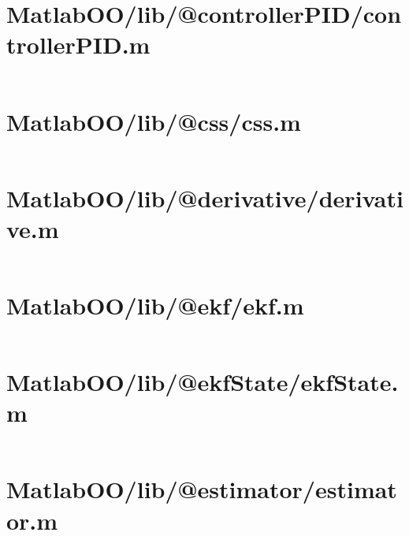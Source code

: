 \pagebreak
\section*{MatlabOO/lib/@controllerPID/controllerPID.m}\label{code:MatlabOO/lib/@controllerPID/controllerPID.m}
\inputminted[linenos,fontsize=\scriptsize]{matlab}{/home/dcouture/git/mathyourlife/TSatPy/beta_versions/matlab_object_oriented/lib/@controllerPID/controllerPID.m}

\pagebreak
\section*{MatlabOO/lib/@css/css.m}\label{code:MatlabOO/lib/@css/css.m}
\inputminted[linenos,fontsize=\scriptsize]{matlab}{/home/dcouture/git/mathyourlife/TSatPy/beta_versions/matlab_object_oriented/lib/@css/css.m}

\pagebreak
\section*{MatlabOO/lib/@derivative/derivative.m}\label{code:MatlabOO/lib/@derivative/derivative.m}
\inputminted[linenos,fontsize=\scriptsize]{matlab}{/home/dcouture/git/mathyourlife/TSatPy/beta_versions/matlab_object_oriented/lib/@derivative/derivative.m}

\pagebreak
\section*{MatlabOO/lib/@ekf/ekf.m}\label{code:MatlabOO/lib/@ekf/ekf.m}
\inputminted[linenos,fontsize=\scriptsize]{matlab}{/home/dcouture/git/mathyourlife/TSatPy/beta_versions/matlab_object_oriented/lib/@ekf/ekf.m}

\pagebreak
\section*{MatlabOO/lib/@ekfState/ekfState.m}\label{code:MatlabOO/lib/@ekfState/ekfState.m}
\inputminted[linenos,fontsize=\scriptsize]{matlab}{/home/dcouture/git/mathyourlife/TSatPy/beta_versions/matlab_object_oriented/lib/@ekfState/ekfState.m}

\pagebreak
\section*{MatlabOO/lib/@estimator/estimator.m}\label{code:MatlabOO/lib/@estimator/estimator.m}
\inputminted[linenos,fontsize=\scriptsize]{matlab}{/home/dcouture/git/mathyourlife/TSatPy/beta_versions/matlab_object_oriented/lib/@estimator/estimator.m}

